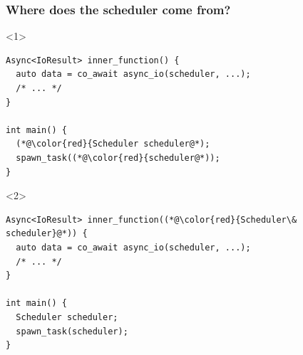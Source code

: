 \documentclass[aspectratio=169]{beamer}
\begin{document}
\begin{frame}[fragile]
  \frametitle{Where does the scheduler come from?}

  \begin{onlyenv}<1>
  \begin{lstlisting}[style=cpp20]
Async<IoResult> inner_function() {
  auto data = co_await async_io(scheduler, ...);
  /* ... */
}

int main() {
  (*@\color{red}{Scheduler scheduler@*);
  spawn_task((*@\color{red}{scheduler@*));
}
  \end{lstlisting}
  \end{onlyenv}
  \begin{onlyenv}<2>
  \begin{lstlisting}[style=cpp20]
Async<IoResult> inner_function((*@\color{red}{Scheduler\& scheduler}@*)) {
  auto data = co_await async_io(scheduler, ...);
  /* ... */
}

int main() {
  Scheduler scheduler;
  spawn_task(scheduler);
}
  \end{lstlisting}
  \end{onlyenv}
\end{frame}
\end{document}
